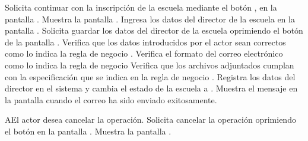  \begin{UCtrayectoria}
    \UCpaso[\UCactor] Solicita continuar con la inscripción de la escuela mediante el botón , en la pantalla .
    \UCpaso[\UCsist] Muestra la pantalla .
    \UCpaso[\UCactor] Ingresa los datos del director de  la escuela en la pantalla . \label{cur4:Acciones}
    \UCpaso[\UCactor] Solicita guardar los datos del director de la escuela oprimiendo el botón  de la pantalla . 
    \UCpaso[\UCsist] Verifica que los datos introducidos por el actor sean correctos como lo indica la regla de negocio .    
   \UCpaso[\UCsist]Verifica el formato del correo electrónico como lo indica la regla de negocio   
   \UCpaso[\UCsist] Verifica que los archivos adjuntados cumplan con la especificación que se indica en la regla de negocio .
    \UCpaso[\UCsist] Registra los datos del director en el sistema y cambia el estado de la escuela a .
    \UCpaso[\UCsist] Muestra el mensaje  en la pantalla  cuando el correo ha sido enviado exitosamente.
 \end{UCtrayectoria}

 \begin{UCtrayectoriaA}{A}{El actor desea cancelar la operación.}
    \UCpaso[\UCactor] Solicita cancelar la operación oprimiendo el botón  en la pantalla .
    \UCpaso[\UCsist] Muestra la pantalla .
 \end{UCtrayectoriaA}

